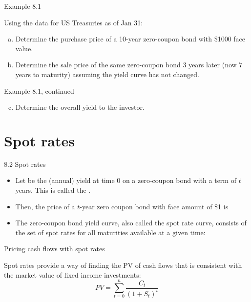 \documentclass{beamer}
\begin{document}
\begin{frame}{Example 8.1}

Using the data for US Treasuries as of Jan 31:
\begin{enumerate}[(a)]
\item Determine the purchase price of a 10-year zero-coupon bond with \$1000 face value.
\vspace{6em}
\item Determine the sale price of the same zero-coupon bond 3 years later (now 7 years to maturity) assuming the yield curve has not changed.
\end{enumerate}

\vfill
\end{frame}

\begin{frame}{Example 8.1, continued}

\begin{enumerate}[(a)]
\setcounter{enumi}{2}
\item Determine the overall yield to the investor.
\end{enumerate}

\vfill
\end{frame}

\section{Spot rates}

\begin{frame}{8.2 Spot rates}

\begin{itemize}
\item Let  be the (annual) yield at time 0 on a zero-coupon bond with a term of $t$ years. This is called the .
\medskip
\item Then, the price of a $t$-year zero coupon bond with face amount of \$1 is
\vspace{5em}
\item The zero-coupon bond yield curve, also called the spot rate curve, consists of the set of spot rates for all maturities available at a given time:
\end{itemize}

\vfill
\end{frame}

\begin{frame}{Pricing cash flows with spot rates}

Spot rates provide a way of finding the PV of cash flows that is consistent with the market value of fixed income investments:
\[
PV = \sum_{t=0}^{n} \frac{C_t}{(1+S_t)^t}
\]

\end{frame}
\end{document}

